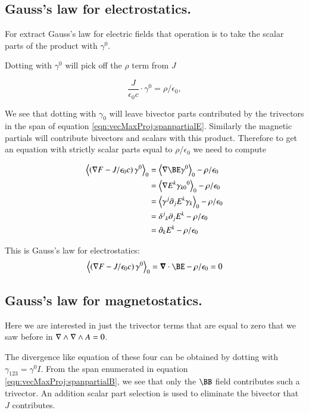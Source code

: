 \subsection{Gauss's law for electrostatics. }

For extract Gauss's law for electric fields that operation is to take the scalar
parts of the product with $\gamma^0$.

Dotting with $\gamma^0$ will pick off the $\rho$ term from
$J$

\begin{equation*}
\frac{J}{\epsilon_0 c} \cdot \gamma^0 = \rho/\epsilon_0,
\end{equation*}

We see that dotting
with $\gamma_0$ will leave bivector parts contributed by the trivectors in
the span of equation \ref{eqn:vecMaxProj:spanpartialE}.  Similarly the magnetic partials
will contribute bivectors and scalars with this product.  Therefore to
get an equation with strictly scalar parts equal to $\rho/\epsilon_0$ we need
to compute

\begin{align*}
\gpgradezero{\left(\grad F - J/\epsilon_0 c\right) \gamma^0} 
&= \gpgradezero{\grad \BE \gamma^0} - \rho/\epsilon_0 \\
&= \gpgradezero{\grad E^k {\gamma_{k0}}^0} - \rho/\epsilon_0 \\
&= \gpgradezero{ \gamma^j \partial_{j} E^k \gamma_{k} } - \rho/\epsilon_0 \\
&= {\delta^j}_k \partial_{j} E^k - \rho/\epsilon_0 \\
&= \partial_{k} E^k - \rho/\epsilon_0 \\
\end{align*}

This is Gauss's law for electrostatics:
\begin{equation}\label{eqn:vecMaxProj:gausselectro}
\gpgradezero{\left(\grad F - J/\epsilon_0 c\right) \gamma^0} = \spacegrad \cdot \BE - \rho/\epsilon_0 = 0
\end{equation}

\subsection{Gauss's law for magnetostatics. }

Here we are interested in just the trivector terms that are equal to zero that we saw before in $\nabla \wedge \nabla \wedge A = 0$.

The divergence like equation of these four can be obtained by dotting with $\gamma_{123} = \gamma^0 I$.  From the span enumerated
in equation \ref{eqn:vecMaxProj:spanpartialB}, we see that only the $\BB$ field contributes such a trivector.  An addition scalar part selection is used
to eliminate the bivector that $J$ contributes.

